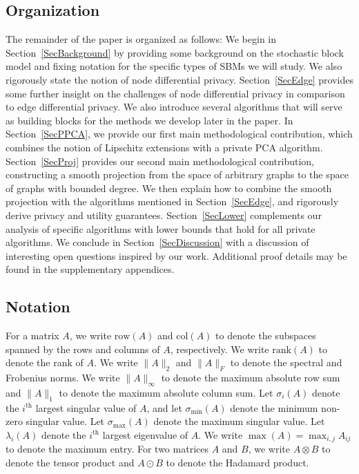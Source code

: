\documentclass{article}
\begin{document}

\subsection{Organization}

The remainder of the paper is organized as follows: We begin in Section~\ref{SecBackground} by providing some background on the stochastic block model and fixing notation for the specific types of SBMs we will study. We also rigorously state the notion of node differential privacy. Section~\ref{SecEdge} provides some further insight on the challenges of node differential privacy in comparison to edge differential privacy. We also introduce several algorithms that will serve as building blocks for the methods we develop later in the paper. In Section~\ref{SecPPCA}, we provide our first main methodological contribution, which combines the notion of Lipschitz extensions with a private PCA algorithm. Section~\ref{SecProj} provides our second main methodological contribution, constructing a smooth projection from the space of arbitrary graphs to the space of graphs with bounded degree. We then explain how to combine the smooth projection with the algorithms mentioned in Section~\ref{SecEdge}, and rigorously derive privacy and utility guarantees. Section~\ref{SecLower} complements our analysis of specific algorithms with lower bounds that hold for all private algorithms. We conclude in Section~\ref{SecDiscussion} with a discussion of interesting open questions inspired by our work. Additional proof details may be found in the supplementary appendices.


\subsection{Notation}

For a matrix $A$, we write $\text{row}(A)$ and $\text{col}(A)$ to denote the subspaces spanned by the rows and columns of $A$, respectively. We write $\text{rank}(A)$ to denote the rank of $A$. We write $\|A\|_2$ and $\|A\|_F$ to denote the spectral and Frobenius norms. We write $\|A\|_\infty$ to denote the maximum absolute row sum and $\|A\|_1$ to denote the maximum absolute column sum. Let $\sigma_i(A)$ denote the $i^{\text{th}}$ largest singular value of $A$, and let $\sigma_{\min}(A)$ denote the minimum non-zero singular value. Let $\sigma_{\max}(A)$ denote the maximum singular value. Let $\lambda_i(A)$ denote the $i^{\text{th}}$ largest eigenvalue of $A$. We write $\max(A) = \max_{i,j} A_{ij}$ to denote the maximum entry. For two matrices $A$ and $B$, we write $A \otimes B$ to denote the tensor product and $A \odot B$ to denote the Hadamard product.
\end{document}
